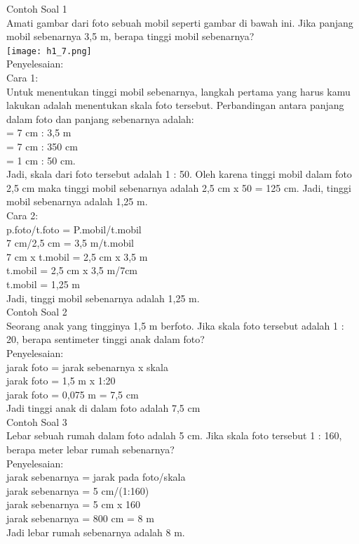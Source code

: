 \documentclass[11pt,fleqn]{book} %
\begin{document}
Contoh Soal 1\\
Amati gambar dari foto sebuah mobil seperti gambar di bawah ini. Jika panjang mobil sebenarnya 3,5 m, berapa tinggi mobil sebenarnya?\\
 \texttt{[image: h1\_7.png]}\\
Penyelesaian:\\
Cara 1:\\
Untuk menentukan tinggi mobil sebenarnya, langkah pertama yang harus kamu lakukan adalah menentukan skala foto tersebut. Perbandingan antara panjang dalam foto dan panjang sebenarnya adalah:\\
= 7 cm : 3,5 m\\
= 7 cm : 350 cm\\
= 1 cm : 50 cm.\\
Jadi, skala dari foto tersebut adalah 1 : 50. Oleh karena tinggi mobil dalam foto 2,5 cm maka tinggi mobil sebenarnya adalah 2,5 cm x 50 = 125 cm. Jadi, tinggi mobil sebenarnya adalah 1,25 m.\\

Cara 2:\\
p.foto/t.foto = P.mobil/t.mobil\\
7 cm/2,5 cm = 3,5 m/t.mobil\\
7 cm x t.mobil = 2,5 cm x 3,5 m\\
t.mobil = 2,5 cm x 3,5 m/7cm\\
t.mobil = 1,25 m\\
Jadi, tinggi mobil sebenarnya adalah 1,25 m.\\

Contoh Soal 2\\
Seorang anak yang tingginya 1,5 m berfoto. Jika skala foto tersebut adalah 1 : 20, berapa sentimeter tinggi anak dalam foto?\\

Penyelesaian:\\
jarak foto = jarak sebenarnya x skala\\
jarak foto = 1,5 m x 1:20\\
jarak foto = 0,075 m = 7,5 cm\\
Jadi tinggi anak di dalam foto adalah 7,5 cm\\

Contoh Soal 3\\
Lebar sebuah rumah dalam foto adalah 5 cm. Jika skala foto tersebut 1 : 160, berapa meter lebar rumah sebenarnya?\\

Penyelesaian:\\
jarak sebenarnya = jarak pada foto/skala\\
jarak sebenarnya = 5 cm/(1:160)\\
jarak sebenarnya = 5 cm x 160\\
jarak sebenarnya = 800 cm = 8 m\\
Jadi lebar rumah sebenarnya adalah 8 m.\\
\end{document}
